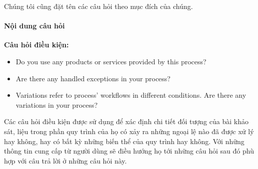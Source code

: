 \par
Chúng tôi cũng đặt tên các câu hỏi theo mục đích của chúng.
\begin{table}[H]
    \def\arraystretch{2}%
    \centering
    \caption{Tên các câu hỏi được sử dụng trong bảng khảo sát}
\end{table}

\paragraph{Nội dung câu hỏi}\mbox{}

\textbf{Câu hỏi điều kiện:}
\begin{itemize}
    \item Do you use any products or services provided by this process?
    \item Are there any handled exceptions in your process?
    \item Variations refer to process’ workflows in different conditions. Are there any variations in your process?
\end{itemize}
\par
Các câu hỏi điều kiện được sử dụng để xác định chi tiết đối tượng của bài khảo sát, liệu trong phần quy trình của họ có xảy ra những ngoại lệ nào đã được xử lý hay không, hay có bất kỳ những biến thể của quy trình hay không. Với những thông tin cung cấp từ người dùng sẽ điều hướng họ tới những câu hỏi sau đó phù hợp với câu trả lời ở những câu hỏi này.

